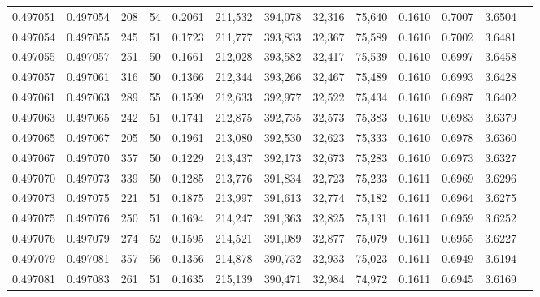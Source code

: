 \begin{tabular}{rrrrrrrrrrrrr}
0.497051 & 0.497054 & 208 &  54 &                                     0.2061 & 211,532 & 394,078 &  32,316 &  75,640 & 0.1610 & 0.7007 & 3.6504 \\
0.497054 & 0.497055 & 245 &  51 &                                     0.1723 & 211,777 & 393,833 &  32,367 &  75,589 & 0.1610 & 0.7002 & 3.6481 \\
0.497055 & 0.497057 & 251 &  50 &                                     0.1661 & 212,028 & 393,582 &  32,417 &  75,539 & 0.1610 & 0.6997 & 3.6458 \\
0.497057 & 0.497061 & 316 &  50 &                                     0.1366 & 212,344 & 393,266 &  32,467 &  75,489 & 0.1610 & 0.6993 & 3.6428 \\
0.497061 & 0.497063 & 289 &  55 &                                     0.1599 & 212,633 & 392,977 &  32,522 &  75,434 & 0.1610 & 0.6987 & 3.6402 \\
0.497063 & 0.497065 & 242 &  51 &                                     0.1741 & 212,875 & 392,735 &  32,573 &  75,383 & 0.1610 & 0.6983 & 3.6379 \\
0.497065 & 0.497067 & 205 &  50 &                                     0.1961 & 213,080 & 392,530 &  32,623 &  75,333 & 0.1610 & 0.6978 & 3.6360 \\
0.497067 & 0.497070 & 357 &  50 &                                     0.1229 & 213,437 & 392,173 &  32,673 &  75,283 & 0.1610 & 0.6973 & 3.6327 \\
0.497070 & 0.497073 & 339 &  50 &                                     0.1285 & 213,776 & 391,834 &  32,723 &  75,233 & 0.1611 & 0.6969 & 3.6296 \\
0.497073 & 0.497075 & 221 &  51 &                                     0.1875 & 213,997 & 391,613 &  32,774 &  75,182 & 0.1611 & 0.6964 & 3.6275 \\
0.497075 & 0.497076 & 250 &  51 &                                     0.1694 & 214,247 & 391,363 &  32,825 &  75,131 & 0.1611 & 0.6959 & 3.6252 \\
0.497076 & 0.497079 & 274 &  52 &                                     0.1595 & 214,521 & 391,089 &  32,877 &  75,079 & 0.1611 & 0.6955 & 3.6227 \\
0.497079 & 0.497081 & 357 &  56 &                                     0.1356 & 214,878 & 390,732 &  32,933 &  75,023 & 0.1611 & 0.6949 & 3.6194 \\
0.497081 & 0.497083 & 261 &  51 &                                     0.1635 & 215,139 & 390,471 &  32,984 &  74,972 & 0.1611 & 0.6945 & 3.6169 \\

\end{tabular}
